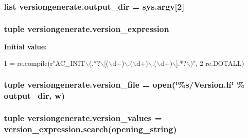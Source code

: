 \subsubsection[{output\+\_\+dir}]{\setlength{\rightskip}{0pt plus 5cm}list versiongenerate.\+output\+\_\+dir = sys.\+argv\mbox{[}2\mbox{]}}\label{namespaceversiongenerate_a66aeb3b9df50fe61aa16e436b75f5a9a}
\hypertarget{namespaceversiongenerate_a7f509e15e9ef2fe82d5fad077a0f901c}{}
\subsubsection[{version\+\_\+expression}]{\setlength{\rightskip}{0pt plus 5cm}tuple versiongenerate.\+version\+\_\+expression}\label{namespaceversiongenerate_a7f509e15e9ef2fe82d5fad077a0f901c}
{\bfseries Initial value\+:}
\begin{DoxyCode}
1 = re.compile(\textcolor{stringliteral}{r"AC\_INIT\(\backslash\)(.*?\(\backslash\)[(\(\backslash\)d+)\(\backslash\).(\(\backslash\)d+)\(\backslash\).(\(\backslash\)d+)\(\backslash\)].*?\(\backslash\))"},
2                                 re.DOTALL)
\end{DoxyCode}
\hypertarget{namespaceversiongenerate_af3ac1aa2af0e761691fdda9a58f461a4}{}
\subsubsection[{version\+\_\+file}]{\setlength{\rightskip}{0pt plus 5cm}tuple versiongenerate.\+version\+\_\+file = open(\char`\"{}\%s/Version.\+h\char`\"{} \% output\+\_\+dir, \textquotesingle{}w\textquotesingle{})}\label{namespaceversiongenerate_af3ac1aa2af0e761691fdda9a58f461a4}
\hypertarget{namespaceversiongenerate_aec88e2b4a2964885f9e88c055cc0cf69}{}
\subsubsection[{version\+\_\+values}]{\setlength{\rightskip}{0pt plus 5cm}tuple versiongenerate.\+version\+\_\+values = version\+\_\+expression.\+search({\bf opening\+\_\+string})}\label{namespaceversiongenerate_aec88e2b4a2964885f9e88c055cc0cf69}
